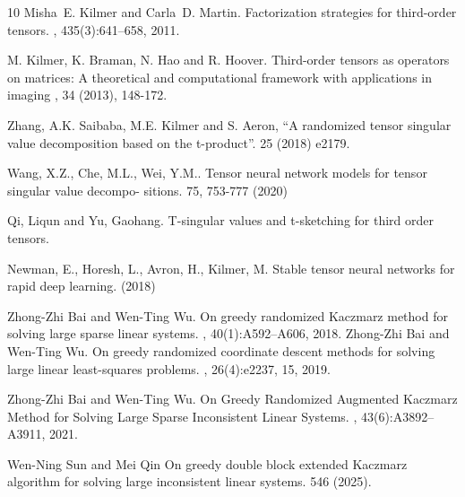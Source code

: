 \documentclass[11pt]{article}
\begin{document}
{\small 
%
%


\begin{thebibliography}{10}
Misha~E. Kilmer and Carla~D. Martin.
\newblock Factorization strategies for third-order tensors.
, 435(3):641--658, 2011.

M. Kilmer, K. Braman, N. Hao and R. Hoover.
\newblock Third-order tensors as operators
on matrices: A theoretical and computational framework with applications in
imaging
, 34 (2013), 148-172.


Zhang, A.K. Saibaba, M.E. Kilmer and S. Aeron, 
\newblock “A randomized tensor singular
value decomposition based on the t-product”.
 25 (2018) e2179.

Wang, X.Z., Che, M.L., Wei, Y.M..
\newblock Tensor neural network models for tensor singular value decompo-
sitions. 
 75, 753-777 (2020)

Qi, Liqun and Yu, Gaohang.
\newblock T-singular values and t-sketching for third order tensors.


Newman, E., Horesh, L., Avron, H., Kilmer, M.
\newblock Stable tensor neural networks for rapid deep learning.
 (2018)

Zhong-Zhi Bai and Wen-Ting Wu.
\newblock On greedy randomized {K}aczmarz method for solving large sparse
  linear systems.
, 40(1):A592--A606, 2018.
Zhong-Zhi Bai and Wen-Ting Wu.
\newblock On greedy randomized coordinate descent methods for solving large
  linear least-squares problems.
, 26(4):e2237, 15, 2019.

Zhong-Zhi Bai and Wen-Ting Wu.
\newblock On {G}reedy {R}andomized {A}ugmented {K}aczmarz {M}ethod for
  {S}olving {L}arge {S}parse {I}nconsistent {L}inear {S}ystems.
, 43(6):A3892--A3911, 2021.

Wen-Ning Sun and Mei Qin
\newblock On greedy double block extended Kaczmarz algorithm for solving
large inconsistent linear systems.
 546 (2025).



\end{thebibliography}}
\end{document}
